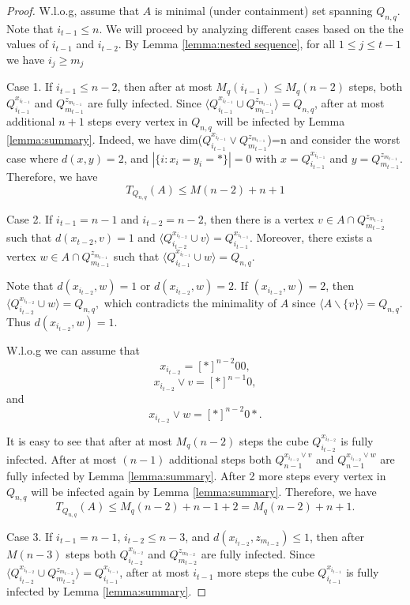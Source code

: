 \documentclass[10pt,a4paper]{amsart}
\renewcommand{\geq}{\geqslant}
\renewcommand{\leq}{\leqslant}
\begin{document}
\begin{proof}
W.l.o.g, assume that $A$ is minimal (under containment) set spanning $Q_{n,q}$. Note that $i_{t-1} \leq n$. We will proceed by analyzing different cases based on the the values of $i_{t-1}$ and $i_{t-2}$. By Lemma \ref{lemma:nested sequence}, for all $ 1 \leq j \leq t-1$ we have $i_j \geq m_j$

Case 1. If $i_{t-1} \leq n-2$, then after at most $M_q(i_{t-1}) \leq M_q(n-2)$ steps, both $Q_{i_{t-1}}^{x_{i_{t-1}}}$ and $Q_{m_{t-1}}^{z_{m_{t-1}}}$ are fully infected. Since $\langle Q_{i_{t-1}}^{x_{i_{t-1}}} \cup Q_{m_{t-1}}^{z_{m_{t-1}}} \rangle=Q_{n,q}$, after at most additional $n+1$ steps every vertex in $Q_{n,q}$ will be infected by Lemma \ref{lemma:summary}. Indeed, we have dim($Q_{i_{t-1}}^{x_{i_{t-1}}} \vee Q_{m_{t-1}}^{z_{m_{t-1}}}$)=n and consider the worst case where $d(x,y)=2$, and $|\{i:x_i=y_i=\ast \}|=0$ with $x=Q_{i_{t-1}}^{x_{i_{t-1}}}$ and $y=Q_{m_{t-1}}^{z_{m_{t-1}}}$.
Therefore, we have 
$$T_{Q_{n,q}}(A) \leq M(n-2)+n+1$$

Case 2. If $i_{t-1}=n-1$ and $i_{t-2}=n-2$, then there is a vertex $v \in A\cap Q_{m_{t-2}}^{z_{m_{t-2}}}$ such that $d(x_{t-2},v)=1$ and $\langle Q_{i_{t-2}}^{x_{i_{t-2}}} \cup v \rangle=Q_{i_{t-1}}^{x_{i_{t-1}}}.$ Moreover, there exists a vertex $w \in A \cap Q_{m_{t-1}}^{z_{m_{t-1}}}$ such that $\langle Q_{i_{t-1}}^{x_{i_{t-1}}} \cup w \rangle=Q_{n,q}.$ 

Note that $d(x_{i_{t-2}},w)=1$ or $d(x_{i_{t-2}},w)=2$. If $(x_{i_{t-2}},w)=2$, then $\langle Q_{i_{t-2}}^{x_{i_{t-2}}} \cup w \rangle=Q_{n,q},$ which contradicts the minimality of $A$ since $\langle A \backslash \{v\} \rangle =Q_{n,q}$. Thus $d(x_{i_{t-2}},w)=1$.

W.l.o.g we can assume that
$$x_{i_{t-2}}=[\ast]^{n-2}00,$$
$$x_{i_{t-2}} \vee v=[\ast]^{n-1}0,$$
and 
$$x_{i_{t-2}} \vee w=[\ast]^{n-2}0\ast.$$

It is easy to see that after at most $M_q(n-2)$ steps the cube $Q_{i_{t-2}}^{x_{i_{t-2}}}$ is fully infected. After at most $(n-1)$ additional steps both $Q_{n-1}^{x_{i_{t-2}} \vee v}$ and $Q_{n-1}^{x_{i_{t-2}} \vee w }$ are fully infected by Lemma \ref{lemma:summary}. After 2 more steps every vertex in $Q_{n,q}$ will be infected again by Lemma \ref{lemma:summary}. Therefore, we have
$$T_{Q_{n,q}}(A) \leq M_q(n-2)+n-1+2 =M_q(n-2)+n+1.$$

Case 3. If $i_{t-1}=n-1$, $i_{t-2} \leq n-3$, and $d({x_{i_{t-2}}},z_{m_{t-2}}) \leq 1$, then after $M(n-3)$ steps both $Q_{i_{t-2}}^{x_{i_{t-2}}}$ and $Q_{m_{t-2}}^{z_{m_{t-2}}}$ are fully infected. Since $\langle Q_{i_{t-2}}^{x_{i_{t-2}}} \cup Q_{m_{t-2}}^{z_{m_{t-2}}} \rangle=Q_{i_{t-1}}^{x_{i_{t-1}}}$, after at most $i_{t-1}$ more steps the cube $Q_{i_{t-1}}^{x_{i_{t-1}}}$ is fully infected by Lemma \ref{lemma:summary}. 


\end{proof}
\end{document}
